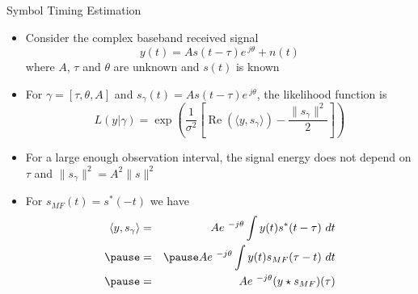 \documentclass[t]{beamer}
\renewcommand\Re{\operatorname{Re}}
\begin{document}
\begin{frame}{Symbol Timing Estimation}
  \footnotesize
  \begin{itemize}
    \item Consider the complex baseband received signal 
      \begin{equation*}
        y(t) = As(t-\tau)e^{\ j\theta} + n(t)
      \end{equation*}
      where $A$, $\tau$ and $\theta$ are unknown and $s(t)$ is known
    \item \pause For $\gamma = [\tau, \theta, A]$ and $s_\gamma(t) = As(t-\tau)e^{\ j\theta}$, the likelihood function is
      \begin{equation*}
        L(y|\gamma) = \exp\left( \frac{1}{\sigma^2} \left[\Re\left(\langle y, s_\gamma\rangle\right) - \frac{\lVert s_\gamma \rVert^2}{2} \right]\right)
      \end{equation*}
    \item \pause For a large enough observation interval, the signal energy does not depend on $\tau$ \pause and $\lVert s_\gamma \rVert^2 = A^2\lVert s \rVert^2$
    \item \pause For $s_{MF}(t) = s^*(-t)$ we have 
      \begin{eqnarray*}
        \langle y, s_\gamma \rangle & = & Ae^{\ -j\theta} \int y(t) s^*(t-\tau) \ dt \\ \pause
                                    & = & \pause A e^{\ -j\theta}\int y(t) s_{MF}(\tau -t) \ dt \\ \pause
                                    & = & Ae^{\ -j\theta} (y\star s_{MF})(\tau)
      \end{eqnarray*}
  \end{itemize}
  \normalsize
\end{frame}
\end{document}
